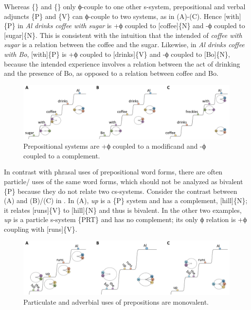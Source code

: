   Whereas \{\} and \{\} only ϕ-couple to one other s-system, prepositional and verbal adjuncts \{P\} and \{V\} can ϕ-couple to two systems, as in {}(A)-(C). Hence [with]\{P\} in \textit{Al drinks coffee with sugar} is +ϕ coupled to [coffee]\{N\} and -ϕ coupled to [sugar]\{N\}. This is consistent with the intuition that the intended  of \textit{coffee with sugar} is a relation between the coffee and the sugar. Likewise, in \textit{Al drinks coffee with Bo}, [with]\{P\} is +ϕ coupled to [drinks]\{V\} and -ϕ coupled to [Bo]\{N\}, because the intended experience involves a relation between the act of drinking and the presence of Bo, as opposed to a relation between coffee and Bo.

  
\begin{figure}
\includegraphics[width=\textwidth]{figures/Tilsen-img84.png}
\caption{Prepositional systems are +ϕ coupled to a modificand and -ϕ coupled to a complement.}
\label{fig:4:34}
\end{figure}
 

  In contrast with phrasal uses of prepositional word forms, there are often particle/ uses of the same word forms, which should not be analyzed as bivalent \{P\} because they do not relate two cs-systems. Consider the contrast between (A) and (B)/(C) in {}. In (A), \textit{up} is a \{P\} system and has a complement, [hill]\{N\}; it relates [runs]\{V\} to [hill]\{N\} and thus is bivalent. In the other two examples, \textit{up} is a particle s-system \{PRT\} and has no complement; its only ϕ relation is +ϕ coupling with [runs]\{V\}.

  
\begin{figure}
\includegraphics[width=\textwidth]{figures/Tilsen-img85.png}
\caption{Particulate and adverbial uses of prepositions are monovalent.}
\label{fig:4:35}
\end{figure}
 

